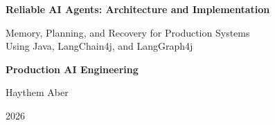 \begin{titlepage}
\thispagestyle{empty}
\vspace*{1.35in}
\begin{center}
{\sffamily\Huge\bfseries\color{BookBlue} Reliable AI Agents: Architecture and Implementation}\par
\vspace{0.35in}
{\sffamily\Large Memory, Planning, and Recovery for Production Systems\\[0.08in]
Using Java, LangChain4j, and LangGraph4j}\par
\vspace{0.55in}
{\sffamily\large\bfseries Production AI Engineering}\par
\vspace{0.65in}
{\Large Haythem Aber}\par
\vfill
{\sffamily\large 2026}\par
\end{center}
\end{titlepage}
